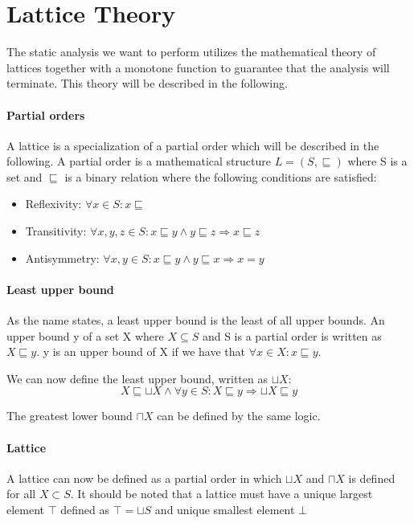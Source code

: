 \section{Lattice Theory}\label{lattice}
The static analysis we want to perform utilizes the mathematical theory of lattices together with a monotone function to guarantee that the analysis will terminate.
This theory will be described in the following.

\paragraph{Partial orders}
A lattice is a specialization of a partial order which will be described in the following.
A partial order is a mathematical structure $L = (S, \sqsubseteq)$ where S is a set and $\sqsubseteq$ is a binary relation where the following conditions are satisfied:
\begin{itemize}
  \item Reflexivity: $\forall x \in S : x \sqsubseteq$
  \item Transitivity: $\forall x,y,z \in S : x \sqsubseteq y \wedge y \sqsubseteq z \Rightarrow x \sqsubseteq z$
  \item Antisymmetry: $\forall x,y \in S: x \sqsubseteq y \wedge y \sqsubseteq x \Rightarrow x = y$
\end{itemize}


\paragraph{Least upper bound}
As the name states, a least upper bound is the least of all upper bounds.
An upper bound y of a set X where $ X \subseteq S$ and S is a partial order is written as $X \sqsubseteq y$.
y is an upper bound of X if we have that $\forall x \in X : x \sqsubseteq y$.

We can now define the least upper bound, written as $\sqcup X$:
\[X \sqsubseteq \sqcup X \wedge \forall y \in S : X \sqsubseteq y \Rightarrow \sqcup X \sqsubseteq y\]

The greatest lower bound $\sqcap X$ can be defined by the same logic.

\paragraph{Lattice}
A lattice can now be defined as a partial order in which $\sqcup X$ and $\sqcap X$ is defined for all $X \subset S$.
It should be noted  that a lattice must have a unique largest element $\top$ defined as $\top = \sqcup S$ and unique smallest element $\bot$ 

